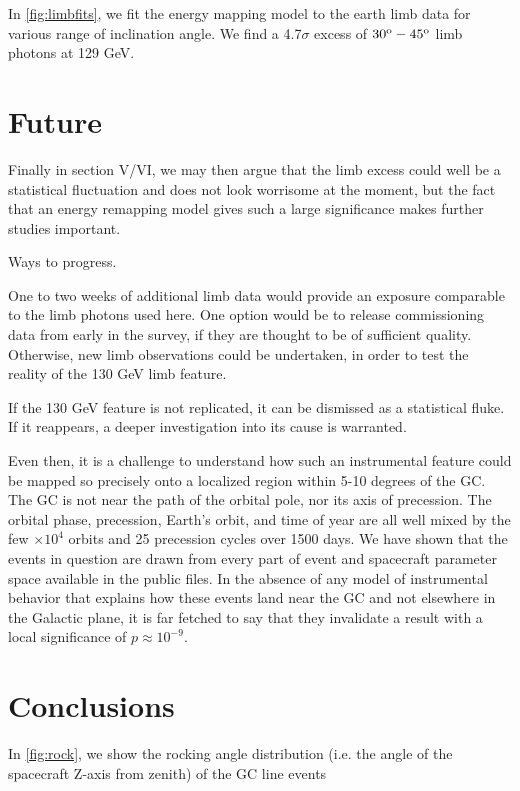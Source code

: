 \documentclass[aps,twocolumn,prd,superscriptaddress,showpacs,nofootinbib,fixfloat]{revtex4}
\newcommand{\degree}{^{\rm o}}
\begin{document}
In \ref{fig:limbfits}, we fit the energy mapping model to
the earth limb data for various range of inclination
angle. We find a 4.7$\sigma$ excess of $30\degree-45\degree$
limb photons at 129 GeV.


\section{Future}
Finally in section V/VI, we may then argue that the limb excess could well be
a statistical fluctuation and does not look worrisome at the moment, but the
fact that an energy remapping model gives such a large significance makes
further studies important.

Ways to progress.

One to two weeks of additional limb data would provide an exposure comparable
to the limb photons used here.  One option would be to release commissioning
data from early in the survey, if they are thought to be of sufficient
quality.  Otherwise, new limb observations could be undertaken, in order to
test the reality of the 130 GeV limb feature.  

If the 130 GeV feature is not replicated, it can be dismissed as a statistical
fluke.  If it reappears, a deeper investigation into its cause is warranted.  

Even then, it is a challenge to understand how such an instrumental feature
could be mapped so precisely onto a localized region within 5-10 degrees of
the GC.  The GC is not near the path of the orbital pole, nor its axis of
precession.  The orbital phase, precession, Earth's orbit, and time of year
are all well mixed by the few $\times10^4$ orbits and 25 precession cycles
over 1500 days.  We have shown that the events in question are drawn from
every part of event and spacecraft parameter space available in the public
files.  In the absence of any model of instrumental behavior that explains how
these events land near the GC and not elsewhere in the Galactic plane, it is
far fetched to say that they invalidate a result with a local significance of
$p\approx10^{-9}$.  


\section{Conclusions}

In \ref{fig:rock}, we show the rocking angle distribution
(i.e. the angle of the spacecraft Z-axis from zenith) of the
GC line events
\end{document}
